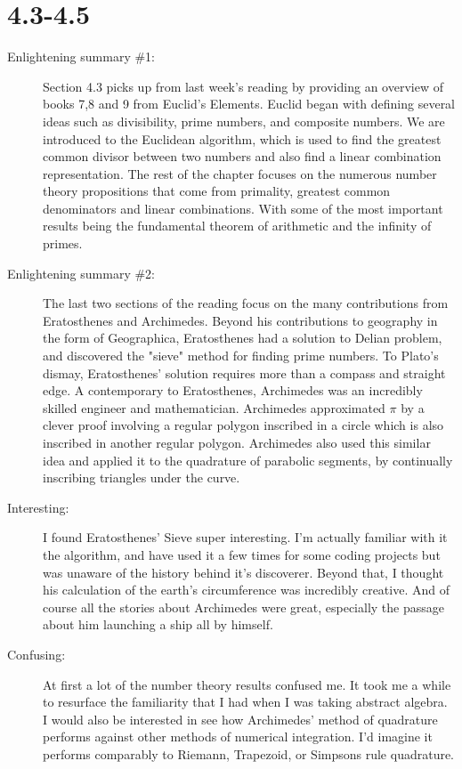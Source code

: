 \documentclass[12pt]{article}
\theoremstyle{homework}
\begin{document}
\section*{4.3-4.5}

\begin{description}
\item[Enlightening summary \#1:]
Section 4.3 picks up from last week's reading by providing an overview of books 7,8 and 9 from Euclid's Elements. Euclid began with defining several 
ideas such as divisibility, prime numbers, and composite numbers. We are introduced to the Euclidean algorithm, which is used to find the greatest common divisor between two numbers and
also find a linear combination representation. The rest of the chapter focuses on the numerous number theory propositions that come from primality, greatest common denominators and linear combinations. 
With some of the most important results being the fundamental theorem of arithmetic and the infinity of primes. 
 
\item[Enlightening summary \#2:] The last two sections of the reading focus on the many contributions from Eratosthenes and Archimedes. Beyond his contributions to
geography in the form of Geographica, Eratosthenes had a solution to Delian problem, and discovered the "sieve" method for finding prime numbers. To Plato's dismay,
Eratosthenes' solution requires more than a compass and straight edge. A contemporary to Eratosthenes, Archimedes was an incredibly skilled engineer and mathematician.
Archimedes approximated $\pi$ by a clever proof involving a regular polygon inscribed in a circle which is also inscribed in another regular polygon. Archimedes also used this similar idea and 
applied it to the quadrature of parabolic segments, by continually inscribing triangles under the curve. 

 


\item[Interesting:] I found Eratosthenes' Sieve super interesting. I'm actually familiar with it the algorithm, and have used it a few times for some coding projects but was unaware of the history behind it's
discoverer. Beyond that, I thought his calculation of the earth's circumference was incredibly creative. And of course all the stories about Archimedes were great, especially the passage about him launching 
a ship all by himself.    
 
 

\item[Confusing:] At first a lot of the number theory results confused me. It took me a while to resurface the familiarity that I had when I was taking abstract algebra. I would also be 
interested in see how Archimedes' method of quadrature performs against other methods of numerical integration. I'd imagine it performs comparably to Riemann, Trapezoid, or Simpsons rule quadrature. 


\end{description}
\end{document}
